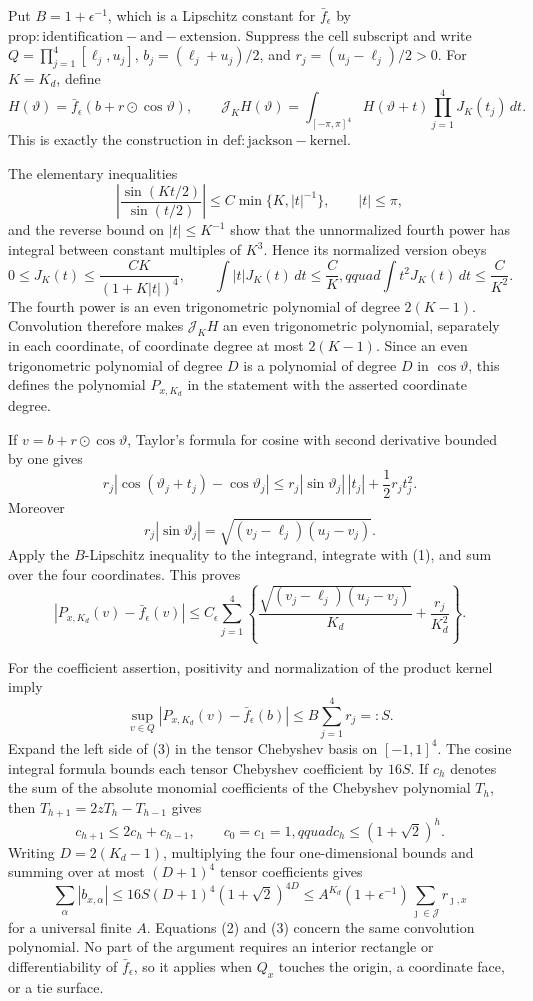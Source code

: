 Put \(B=1+\epsilon^{-1}\), which is a Lipschitz constant for \(\bar f_\epsilon\) by \(\mathrm{prop:identification-and-extension}\).  Suppress the cell subscript and write \(Q=\prod_{j=1}^4[\ell_j,u_j]\), \(b_j=(\ell_j+u_j)/2\), and \(r_j=(u_j-\ell_j)/2>0\).  For \(K=K_d\), define
\[
 H(\vartheta)=\bar f_\epsilon(b+r\odot\cos\vartheta),
 \qquad
 \mathcal J_KH(\vartheta)=\int_{[-\pi,\pi]^4}H(\vartheta+t)\prod_{j=1}^4J_K(t_j)\,dt.
\]
This is exactly the construction in \(\mathrm{def:jackson-kernel}\).

The elementary inequalities
\[
 \left|\frac{\sin(Kt/2)}{\sin(t/2)}\right|
 \leq C\min\{K,|t|^{-1}\},
 \qquad |t|\leq\pi,
\]
and the reverse bound on \(|t|\leq K^{-1}\) show that the unnormalized fourth power has integral between constant multiples of \(K^3\).  Hence its normalized version obeys
\[
 0\leq J_K(t)\leq\frac{CK}{(1+K|t|)^4},\qquad
 \int|t|J_K(t)\,dt\leq\frac CK,qquad
 \int t^2J_K(t)\,dt\leq\frac C{K^2}.                                      \tag{1}
\]
The fourth power is an even trigonometric polynomial of degree \(2(K-1)\).  Convolution therefore makes \(\mathcal J_KH\) an even trigonometric polynomial, separately in each coordinate, of coordinate degree at most \(2(K-1)\).  Since an even trigonometric polynomial of degree \(D\) is a polynomial of degree \(D\) in \(\cos\vartheta\), this defines the polynomial \(P_{x,K_d}\) in the statement with the asserted coordinate degree.

If \(v=b+r\odot\cos\vartheta\), Taylor's formula for cosine with second derivative bounded by one gives
\[
 r_j|\cos(\vartheta_j+t_j)-\cos\vartheta_j|
 \leq r_j|\sin\vartheta_j|\,|t_j|+\frac12r_jt_j^2.
\]
Moreover
\[
 r_j|\sin\vartheta_j|=\sqrt{(v_j-\ell_j)(u_j-v_j)}.
\]
Apply the \(B\)-Lipschitz inequality to the integrand, integrate with (1), and sum over the four coordinates.  This proves
\[
 |P_{x,K_d}(v)-\bar f_\epsilon(v)|
 \leq C_\epsilon\sum_{j=1}^4\left\{
 \frac{\sqrt{(v_j-\ell_j)(u_j-v_j)}}{K_d}+\frac{r_j}{K_d^2}
 \right\}.                                                               \tag{2}
\]

For the coefficient assertion, positivity and normalization of the product kernel imply
\[
 \sup_{v\in Q}|P_{x,K_d}(v)-\bar f_\epsilon(b)|
 \leq B\sum_{j=1}^4r_j=:S.                                               \tag{3}
\]
Expand the left side of (3) in the tensor Chebyshev basis on \([-1,1]^4\).  The cosine integral formula bounds each tensor Chebyshev coefficient by \(16S\).  If \(c_h\) denotes the sum of the absolute monomial coefficients of the Chebyshev polynomial \(T_h\), then \(T_{h+1}=2zT_h-T_{h-1}\) gives
\[
 c_{h+1}\leq2c_h+c_{h-1},\qquad c_0=c_1=1,qquad
 c_h\leq(1+\sqrt2)^h.
\]
Writing \(D=2(K_d-1)\), multiplying the four one-dimensional bounds and summing over at most \((D+1)^4\) tensor coefficients gives
\[
 \sum_\alpha|b_{x,\alpha}|
 \leq16S(D+1)^4(1+\sqrt2)^{4D}
 \leq A^{K_d}(1+\epsilon^{-1})\sum_{\jmath\in\mathcal J}r_{\jmath,x}
\]
for a universal finite \(A\).  Equations (2) and (3) concern the same convolution polynomial.  No part of the argument requires an interior rectangle or differentiability of \(\bar f_\epsilon\), so it applies when \(Q_x\) touches the origin, a coordinate face, or a tie surface.